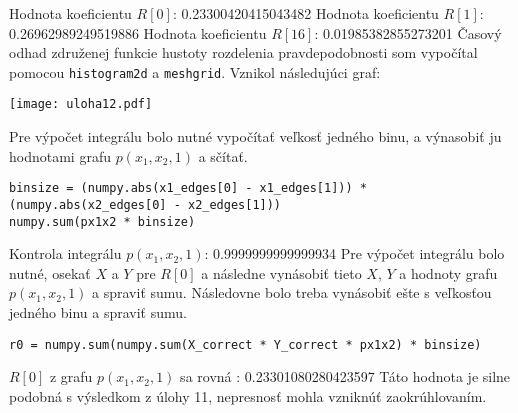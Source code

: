 \documentclass[11pt]{homework}
\begin{document}
Hodnota koeficientu $R[0]$: 0.23300420415043482 \newline
Hodnota koeficientu $R[1]:$ 0.26962989249519886 \newline
Hodnota koeficientu $R[16]$: 0.01985382855273201 \newline
{}
Časový odhad združenej funkcie hustoty rozdelenia pravdepodobnosti som vypočítal pomocou \verb|histogram2d| a \verb|meshgrid|. \newline
Vznikol následujúci graf:
\begin{center}
\texttt{[image: uloha12.pdf]}
\end{center}
Pre výpočet integrálu bolo nutné vypočítať veľkosť jedného binu, a výnasobiť ju hodnotami grafu $p(x_1, x_2, 1)$ a sčítať.
\begin{verbatim}
binsize = (numpy.abs(x1_edges[0] - x1_edges[1])) * (numpy.abs(x2_edges[0] - x2_edges[1]))
numpy.sum(px1x2 * binsize)
\end{verbatim}
Kontrola integrálu  $p(x_1, x_2, 1)$: 0.9999999999999934\newline
{}
Pre výpočet integrálu bolo nutné, osekať $X$ a $Y$  pre $R[0]$ a následne vynásobiť tieto $X$, $Y$ a hodnoty grafu $p(x_1, x_2, 1)$ a spraviť sumu. Následovne bolo treba vynásobiť ešte s veľkosťou jedného binu a spraviť sumu.
\begin{verbatim}
r0 = numpy.sum(numpy.sum(X_correct * Y_correct * px1x2) * binsize)
\end{verbatim}
$R[0]$ z grafu $p(x_1 ,x_2 , 1)$ sa rovná : 0.23301080280423597\newline
Táto hodnota je silne podobná s výsledkom z úlohy 11, nepresnosť mohla vzniknúť zaokrúhlovaním.
\end{document}
